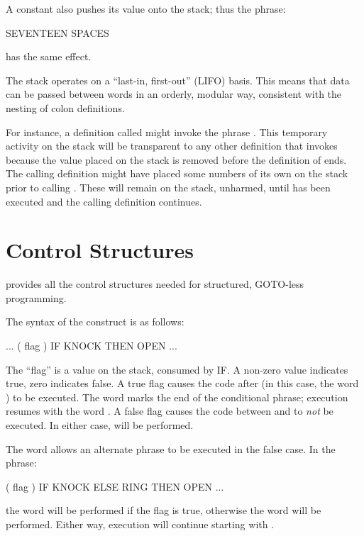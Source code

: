 A constant also pushes its value onto the stack; thus the phrase:
\begin{Code}
SEVENTEEN SPACES
\end{Code}
has the same effect.

The stack operates on a ``last-in, first-out'' (LIFO) basis.  This means
that data can be passed between words in an orderly, modular way,
consistent with the nesting of colon definitions.

For instance, a definition called  might invoke the phrase
.  This temporary activity on the stack will be
transparent to any other definition that invokes  because the
value placed on the stack is removed before the definition of 
ends.  The calling definition might have placed some numbers of its own on
the stack prior to calling .  These will remain on the stack,
unharmed, until  has been executed and the calling definition
continues.

\section{Control Structures}
\Forth{} provides all the control structures%
needed for structured, GOTO-less programming.

The syntax of the  construct is as follows:
\begin{Code}
... ( flag ) IF  KNOCK  THEN  OPEN ...
\end{Code}
The ``flag'' is a value on the stack, consumed by IF. A
non-zero value indicates true, zero indicates false.  A true flag causes
the code after  (in this case, the word ) to be
executed.  The word  marks the end of the conditional phrase;
execution resumes with the word .  A false flag causes the
code between  and  to {\em not} be executed.  In
either case,  will be performed.

The word  allows an alternate phrase to be
executed in the false case. In the phrase:
\begin{Code}
( flag ) IF KNOCK  ELSE  RING  THEN  OPEN ...
\end{Code}
the word  will be performed if the flag is true, otherwise
the word  will be performed.  Either way, execution will
continue starting with .

